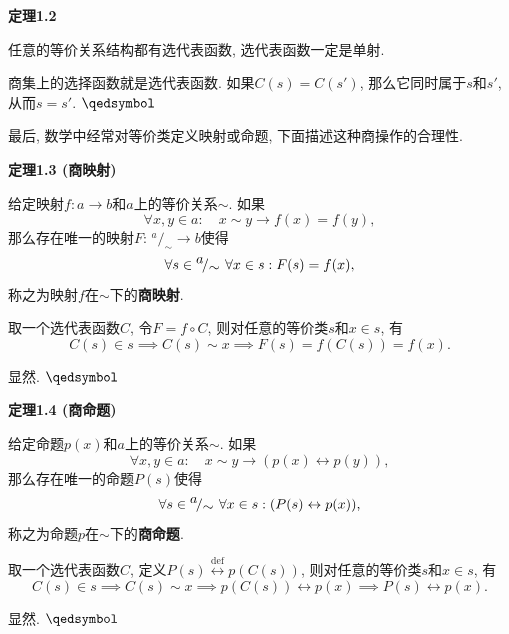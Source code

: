 \documentclass[UTF8]{ctexart}
\begin{document}
\hypertarget{sec:定理1.2}{}
\noindent\textbf{定理1.2}

任意的等价关系结构都有选代表函数, 选代表函数一定是单射.


商集上的选择函数就是选代表函数.
如果$C(s)=C(s')$, 那么它同时属于$s$和$s'$, 从而$s=s'$. \hfill $\qedsymbol$

\vspace{10pt}

最后, 数学中经常对等价类定义映射或命题, 下面描述这种商操作的合理性.

\vspace{10pt}

\hypertarget{sec:定理1.3}{}
\noindent\textbf{定理1.3 (商映射)}

给定映射$f:a\to b$和$a$上的等价关系$\sim$. 如果
\[
    \forall x,y\in a:\quad x\sim y\to f(x)=f(y),
\]
那么存在唯一的映射$F:\,\!^{\displaystyle a}\!/_{\displaystyle\sim}\to b$使得
\[
    \forall s\in\,\!^{\displaystyle a}\!/_{\displaystyle\sim}\,\,
    \forall x\in s:F(s)=f(x),\\[1pt]
\]
称之为映射$f$在$\sim$下的\textbf{商映射}.



取一个选代表函数$C$, 令$F=f\circ C$, 则对任意的等价类$s$和$x\in s$, 有
\[
    C(s)\in s\implies C(s)\sim x\implies F(s)=f(C(s))=f(x).
\]

 显然. \hfill $\qedsymbol$

\vspace{10pt}

\hypertarget{sec:定理1.4}{}
\noindent\textbf{定理1.4 (商命题)}

给定命题$p(x)$和$a$上的等价关系$\sim$. 如果
\[
    \forall x,y\in a:\quad x\sim y\to(p(x)\leftrightarrow p(y)),
\]
那么存在唯一的命题$P(s)$使得
\[
    \forall s\in\,\!^{\displaystyle a}\!/_{\displaystyle\sim}\,\,
    \forall x\in s:(P(s)\leftrightarrow p(x)),\\[1pt]
\]
称之为命题$p$在$\sim$下的\textbf{商命题}.



取一个选代表函数$C$, 定义$P(s)\overset{\mathrm{def}}{\leftrightarrow}p(C(s))$,
则对任意的等价类$s$和$x\in s$, 有
\[
    C(s)\in s\implies C(s)\sim x\implies p(C(s))\leftrightarrow p(x)
    \implies P(s)\leftrightarrow p(x).
\]

 显然. \hfill $\qedsymbol$
\end{document}
